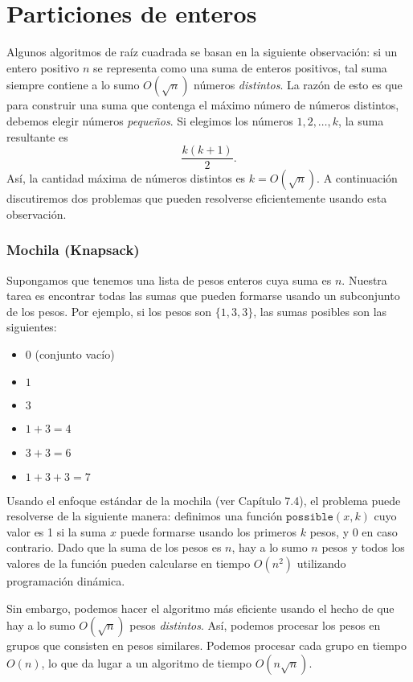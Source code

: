 \section{Particiones de enteros}

Algunos algoritmos de raíz cuadrada se basan en la siguiente observación:
si un entero positivo \( n \) se representa como una suma de enteros positivos,
tal suma siempre contiene a lo sumo \( O(\sqrt n) \) números \emph{distintos}.
La razón de esto es que para construir una suma que contenga el máximo número de números distintos, debemos elegir números \emph{pequeños}.
Si elegimos los números \( 1, 2, \ldots, k \),
la suma resultante es
\[
\frac{k(k+1)}{2}.
\]
Así, la cantidad máxima de números distintos es \( k = O(\sqrt n) \).
A continuación discutiremos dos problemas que pueden resolverse eficientemente usando esta observación.

\subsubsection{Mochila (Knapsack)}

Supongamos que tenemos una lista de pesos enteros cuya suma es \( n \).
Nuestra tarea es encontrar todas las sumas que pueden formarse usando un subconjunto de los pesos. Por ejemplo, si los pesos son \( \{1, 3, 3\} \), las sumas posibles son las siguientes:

\begin{itemize}[noitemsep]
\item \( 0 \) (conjunto vacío)
\item \( 1 \)
\item \( 3 \)
\item \( 1+3=4 \)
\item \( 3+3=6 \)
\item \( 1+3+3=7 \)
\end{itemize}

Usando el enfoque estándar de la mochila (ver Capítulo 7.4),
el problema puede resolverse de la siguiente manera:
definimos una función \( \texttt{possible}(x,k) \) cuyo valor es 1
si la suma \( x \) puede formarse usando los primeros \( k \) pesos,
y 0 en caso contrario.
Dado que la suma de los pesos es \( n \),
hay a lo sumo \( n \) pesos y
todos los valores de la función pueden calcularse
en tiempo \( O(n^2) \) utilizando programación dinámica.

Sin embargo, podemos hacer el algoritmo más eficiente
usando el hecho de que hay a lo sumo \( O(\sqrt n) \)
pesos \emph{distintos}.
Así, podemos procesar los pesos en grupos
que consisten en pesos similares.
Podemos procesar cada grupo
en tiempo \( O(n) \), lo que da lugar a un algoritmo de tiempo \( O(n \sqrt n) \).

